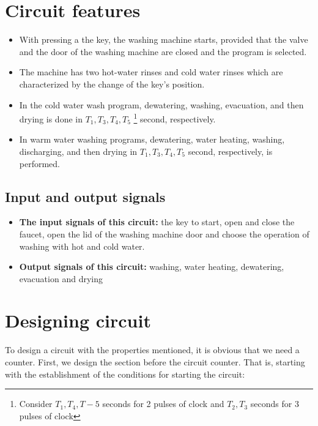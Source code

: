 \documentclass[12pt]{article}
\begin{document}
\section{Circuit features}
\label{sec:Circuit features}

\begin{itemize}
  \item  With pressing a the key, the washing machine starts, provided that the valve and the door of the washing machine are closed and the program is selected.
  \item The machine has two hot-water rinses and cold water rinses which are characterized by the change of the key's position.
  \item  In the cold water wash program, dewatering, washing, evacuation, and then drying is done in $ T_1, T_3, T_4, T_5$ \footnote{\label{pulses note} Consider $T_1, T_4, T-5$  seconds for 2 pulses of clock and $T_2, T_3$  seconds for 3 pulses of clock}  second, respectively.
  \item In warm water washing programs, dewatering, water heating, washing, discharging, and then drying in $ T_1, T_3, T_4, T_5 $  \footnotemark{\ref{pulses note}}  second, respectively, is performed.

\end{itemize}

\subsection{Input and output signals}
\begin{itemize}
\item \textbf{The input signals of this circuit:} the key to start, open and close the faucet, open the lid of the washing machine door and choose the operation of washing with hot and cold water.
  \item \textbf{Output signals of this circuit:} washing, water heating, dewatering, evacuation and drying
\end{itemize}

\section{Designing circuit}
\label{sec:Designing circuit
}
To design a circuit with the properties mentioned, it is obvious that we need a counter. First, we design the section before the circuit counter. That is, starting with the establishment of the conditions for starting the circuit:
\end{document}
